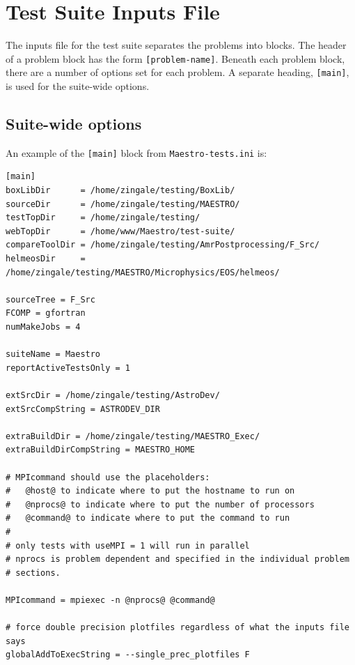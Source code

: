 \section{Test Suite Inputs File}

The inputs file for the test suite separates the problems into blocks.
The header of a problem block has the form {\tt [problem-name]}.
Beneath each problem block, there are a number of options set for each
problem.  A separate heading, {\tt [main]}, is used for the suite-wide
options.

\subsection{Suite-wide options}

An example of the {\tt [main]} block from {\tt Maestro-tests.ini} is:
\begin{lstlisting}
[main]
boxLibDir      = /home/zingale/testing/BoxLib/
sourceDir      = /home/zingale/testing/MAESTRO/
testTopDir     = /home/zingale/testing/
webTopDir      = /home/www/Maestro/test-suite/
compareToolDir = /home/zingale/testing/AmrPostprocessing/F_Src/
helmeosDir     = /home/zingale/testing/MAESTRO/Microphysics/EOS/helmeos/

sourceTree = F_Src
FCOMP = gfortran
numMakeJobs = 4

suiteName = Maestro
reportActiveTestsOnly = 1

extSrcDir = /home/zingale/testing/AstroDev/
extSrcCompString = ASTRODEV_DIR

extraBuildDir = /home/zingale/testing/MAESTRO_Exec/
extraBuildDirCompString = MAESTRO_HOME

# MPIcommand should use the placeholders:
#   @host@ to indicate where to put the hostname to run on
#   @nprocs@ to indicate where to put the number of processors
#   @command@ to indicate where to put the command to run
#
# only tests with useMPI = 1 will run in parallel
# nprocs is problem dependent and specified in the individual problem
# sections.

MPIcommand = mpiexec -n @nprocs@ @command@

# force double precision plotfiles regardless of what the inputs file says
globalAddToExecString = --single_prec_plotfiles F
\end{lstlisting}

